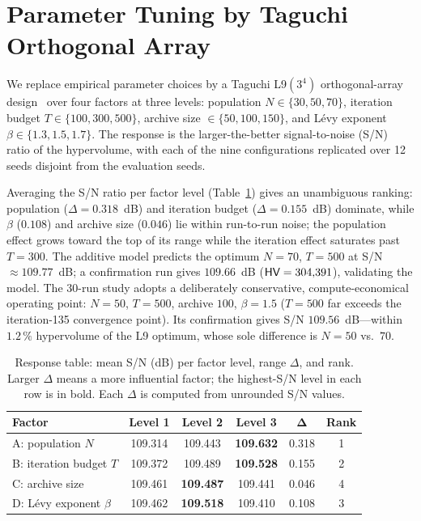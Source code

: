 \section{Parameter Tuning by Taguchi Orthogonal Array}
\label{sec:taguchi}

We replace empirical parameter choices by a Taguchi L9$(3^4)$ orthogonal-array design~\cite{alrafei,montgomery} over four factors at three levels: population $N\in\{30,50,70\}$, iteration budget $T\in\{100,300,500\}$, archive size $\in\{50,100,150\}$, and L\'evy exponent $\beta\in\{1.3,1.5,1.7\}$. The response is the larger-the-better signal-to-noise (S/N) ratio of the hypervolume, with each of the nine configurations replicated over 12 seeds disjoint from the evaluation seeds.

Averaging the S/N ratio per factor level (Table~\ref{tab:response}) gives an unambiguous ranking: population ($\Delta=0.318$~dB) and iteration budget ($\Delta=0.155$~dB) dominate, while $\beta$ ($0.108$) and archive size ($0.046$) lie within run-to-run noise; the population effect grows toward the top of its range while the iteration effect saturates past $T{=}300$. The additive model predicts the optimum $N{=}70$, $T{=}500$ at S/N $\approx109.77$~dB; a confirmation run gives $109.66$~dB ($\textsf{HV}=304{,}391$), validating the model. The 30-run study adopts a deliberately conservative, compute-economical operating point: $N{=}50$, $T{=}500$, archive $100$, $\beta{=}1.5$ ($T{=}500$ far exceeds the iteration-135 convergence point). Its confirmation gives S/N $109.56$~dB---within $1.2\,\%$ hypervolume of the L9 optimum, whose sole difference is $N{=}50$ vs.\ $70$.

\begin{table}[t]
\centering
\caption{Response table: mean S/N (dB) per factor level, range $\Delta$, and rank. Larger $\Delta$ means a more influential factor; the highest-S/N level in each row is in bold. Each $\Delta$ is computed from unrounded S/N values.}
\label{tab:response}
\small
\begin{tabular}{lccccc}
\toprule
\textbf{Factor} & \textbf{Level 1} & \textbf{Level 2} & \textbf{Level 3} & $\boldsymbol{\Delta}$ & \textbf{Rank}\\
\midrule
A: population $N$        & 109.314 & 109.443 & \textbf{109.632} & 0.318 & 1\\
B: iteration budget $T$  & 109.372 & 109.489 & \textbf{109.528} & 0.155 & 2\\
C: archive size          & 109.461 & \textbf{109.487} & 109.441 & 0.046 & 4\\
D: Lévy exponent $\beta$ & 109.462 & \textbf{109.518} & 109.410 & 0.108 & 3\\
\bottomrule
\end{tabular}
\end{table}

